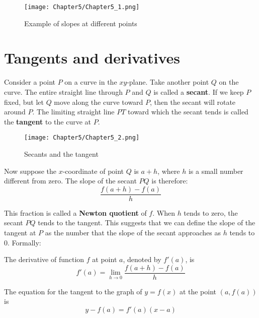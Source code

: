 \documentclass[10pt,a4paper]{book}
\theoremstyle{definition}\newtheorem{definition}{Definition}
\theoremstyle{definition}\newtheorem{fact}{Fact}
\theoremstyle{definition}\newtheorem{ex}{Ex.}
\theoremstyle{definition}\newtheorem{project}{Project}
\theoremstyle{definition}\newtheorem{problem}{Problem}
\theoremstyle{definition}\newtheorem{example}{Example}
\numberwithin{theorem}{chapter}
\numberwithin{corollary}{chapter}
\numberwithin{assumption}{chapter}
\numberwithin{definition}{chapter}
\numberwithin{prop}{chapter}
\numberwithin{notation}{chapter}
\numberwithin{problem}{chapter}
\numberwithin{example}{chapter}
\numberwithin{fact}{chapter}
\numberwithin{ex}{chapter}
\begin{document}
	\begin{figure}
		\centering
		\texttt{[image: Chapter5/Chapter5\_1.png]}
		\caption{Example of slopes at different points}
	\end{figure}
	
	\section{Tangents and derivatives}
	
	Consider a point $P$ on a curve in the $xy$-plane. Take another point $Q$ on the curve. The entire straight line through $P$ and $Q$ is called a \textbf{secant}. If we keep $P$ fixed, but let $Q$ move along the curve toward $P$, then the secant will rotate around $P$. The limiting straight line $PT$ toward which the secant tends is called the \textbf{tangent} to the curve at $P$. 
	
	\begin{figure}
		\centering
		\texttt{[image: Chapter5/Chapter5\_2.png]}
		\caption{Secants and the tangent}
	\end{figure}
	
	Now suppose the $x$-coordinate of point $Q$ is $a+h$, where $h$ is a small number different from zero. The slope of the secant $PQ$ is therefore:
	$$\frac{f(a+h)-f(a)}{h}$$
	
	This fraction is called a \textbf{Newton quotient} of $f$. When $h$ tends to zero, the secant $PQ$ tends to the tangent. This suggests that we can define the slope of the tangent at $P$ as the number that the slope of the secant approaches as $h$ tends to 0. Formally:
	
	The derivative of function $f$ at point $a$, denoted by $f'(a)$, is 
	$$f'(a) = \lim_{h \rightarrow 0} \frac{f(a+h)-f(a)}{h}$$
	
	The equation for the tangent to the graph of $y = f (x)$ at the point $(a, f (a))$ is
	$$y - f (a) = f '(a)(x - a)$$
	
\end{document}
